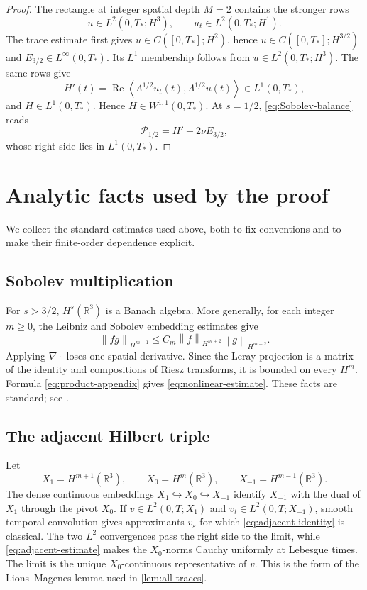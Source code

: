 \documentclass[11pt]{article}
\theoremstyle{definition}
\theoremstyle{remark}
\newcommand{\R}{\mathbb R}
\newcommand{\norm}[1]{\left\lVert #1\right\rVert}
\newcommand{\pair}[2]{\left\langle #1,#2\right\rangle}
\begin{document}
\begin{proof}
The rectangle at integer spatial depth \(M=2\) contains the stronger rows
\[
 u\in L^2(0,T_*;H^3),
 \qquad
 u_t\in L^2(0,T_*;H^1).
\]
The trace estimate first gives \(u\in C([0,T_*];H^2)\), hence
\(u\in C([0,T_*];H^{3/2})\) and
\(E_{3/2}\in L^\infty(0,T_*)\).  Its \(L^1\) membership follows from
\(u\in L^2(0,T_*;H^3)\).  The same rows give
\[
 H'(t)=\operatorname{Re}
 \pair{\Lambda^{1/2}u_t(t)}{\Lambda^{1/2}u(t)}\in L^1(0,T_*),
\]
and \(H\in L^1(0,T_*)\).  Hence \(H\in W^{1,1}(0,T_*)\).  At
\(s=1/2\), \eqref{eq:Sobolev-balance} reads
\[
 \mathcal P_{1/2}=H'+2\nu E_{3/2},
\]
whose right side lies in \(L^1(0,T_*)\).
\end{proof}

\appendix

\section{Analytic facts used by the proof}
\label{app:analytic}

We collect the standard estimates used above, both to fix conventions and to
make their finite-order dependence explicit.

\subsection{Sobolev multiplication}

For \(s>3/2\), \(H^s(\R^3)\) is a Banach algebra.  More generally, for each
integer \(m\geq0\), the Leibniz and Sobolev embedding estimates give
\begin{equation}
 \norm{fg}_{H^{m+1}}
 \leq C_m\norm{f}_{H^{m+2}}\norm{g}_{H^{m+2}}.
 \label{eq:product-appendix}
\end{equation}
Applying \(\nabla\cdot\) loses one spatial derivative.  Since the Leray
projection is a matrix of the identity and compositions of Riesz transforms,
it is bounded on every \(H^m\).  Formula \eqref{eq:product-appendix} gives
\eqref{eq:nonlinear-estimate}.  These facts are standard; see
\cite{BCD,Stein}.

\subsection{The adjacent Hilbert triple}

Let
\[
 X_1=H^{m+1}(\R^3),
 \qquad X_0=H^m(\R^3),
 \qquad X_{-1}=H^{m-1}(\R^3).
\]
The dense continuous embeddings
\(X_1\hookrightarrow X_0\hookrightarrow X_{-1}\) identify \(X_{-1}\) with
the dual of \(X_1\) through the pivot \(X_0\).  If
\(v\in L^2(0,T;X_1)\) and \(v_t\in L^2(0,T;X_{-1})\), smooth temporal
convolution gives approximants \(v_\varepsilon\) for which
\eqref{eq:adjacent-identity} is classical.  The two \(L^2\) convergences pass
the right side to the limit, while \eqref{eq:adjacent-estimate} makes the
\(X_0\)-norms Cauchy uniformly at Lebesgue times.  The limit is the unique
\(X_0\)-continuous representative of \(v\).  This is the form of the
Lions--Magenes lemma used in \cref{lem:all-traces}.
\end{document}
